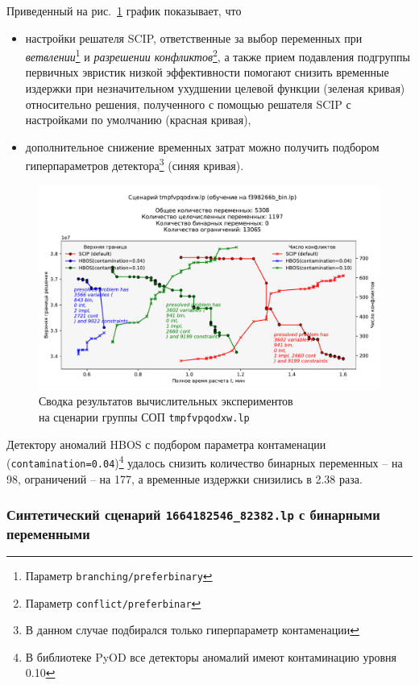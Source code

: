 \documentclass[%
	11pt,
	a4paper,
	utf8,
		]{article}
\begin{document}
Приведенный на рис.~\ref{fig:summary_tmpfvpqodxw} график показывает, что
\begin{itemize}
	\item настройки решателя SCIP, ответственные за выбор переменных при \emph{ветвлении}\footnote{Параметр \texttt{branching/preferbinary}} и \emph{разрешении конфликтов}\footnote{Параметр \texttt{conflict/preferbinar}}, а также прием подавления подгруппы первичных эвристик низкой эффективности помогают снизить временные издержки при незначительном ухудшении целевой функции (зеленая кривая) относительно решения, полученного с помощью решателя SCIP с настройками по умолчанию (красная кривая),
	
	\item дополнительное снижение временных затрат можно получить подбором гиперпараметров детектора\footnote{В данном случае подбирался только гиперпараметр контаменации} (синяя кривая).
\end{itemize}

\begin{figure}[!h]
	\centering
	\includegraphics[scale=0.7]{figures/tmpfvpqodxw_edo.pdf}
	\caption{ Сводка результатов вычислительных экспериментов \\на сценарии группы СОП \texttt{tmpfvpqodxw.lp} }\label{fig:summary_tmpfvpqodxw}
\end{figure}

Детектору аномалий HBOS с подбором параметра контаменации (\texttt{contamination=0.04})\footnote{В библиотеке PyOD все детекторы аномалий имеют контаминацию уровня 0.10} удалось снизить количество бинарных переменных -- на 98, ограничений -- на 177, а  временные издержки снизились в 2.38 раза.


\subsubsection{Синтетический сценарий \texttt{1664182546\_82382.lp} с бинарными переменными}
\end{document}
